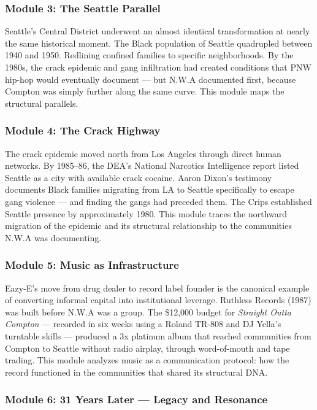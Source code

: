 \documentclass[11pt,letterpaper]{article}
\begin{document}
\subsubsection{Module 3: The Seattle Parallel}

Seattle's Central District underwent an almost identical transformation at nearly the same historical moment. The Black population of Seattle quadrupled between 1940 and 1950. Redlining confined families to specific neighborhoods. By the 1980s, the crack epidemic and gang infiltration had created conditions that PNW hip-hop would eventually document --- but N.W.A documented first, because Compton was simply further along the same curve. This module maps the structural parallels.

\subsubsection{Module 4: The Crack Highway}

The crack epidemic moved north from Los Angeles through direct human networks. By 1985--86, the DEA's National Narcotics Intelligence report listed Seattle as a city with available crack cocaine. Aaron Dixon's testimony documents Black families migrating from LA to Seattle specifically to escape gang violence --- and finding the gangs had preceded them. The Crips established Seattle presence by approximately 1980. This module traces the northward migration of the epidemic and its structural relationship to the communities N.W.A was documenting.

\subsubsection{Module 5: Music as Infrastructure}

Eazy-E's move from drug dealer to record label founder is the canonical example of converting informal capital into institutional leverage. Ruthless Records (1987) was built before N.W.A was a group. The \$12,000 budget for \textit{Straight Outta Compton} --- recorded in six weeks using a Roland TR-808 and DJ Yella's turntable skills --- produced a 3x platinum album that reached communities from Compton to Seattle without radio airplay, through word-of-mouth and tape trading. This module analyzes music as a communication protocol: how the record functioned in the communities that shared its structural DNA.

\subsubsection{Module 6: 31 Years Later --- Legacy and Resonance}
\end{document}
